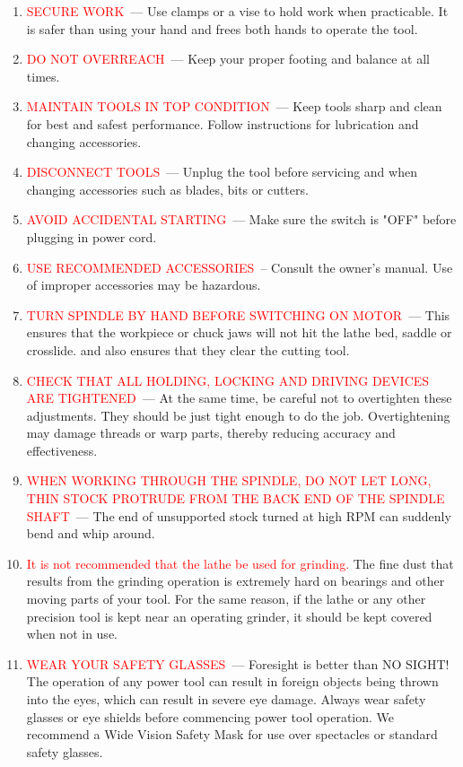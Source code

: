 \begin{enumerate}
\item\textcolor{Red}{SECURE WORK}\ --- Use clamps or a vise to hold work when
practicable. It is safer than using your hand and frees both hands to operate
the tool.

\item\textcolor{Red}{DO NOT OVERREACH}\ --- Keep your proper footing and balance
at all times.

\item\textcolor{Red}{MAINTAIN TOOLS IN TOP CONDITION}\ --- Keep tools sharp and
clean for best and safest performance. Follow instructions for lubrication and
changing accessories.

\item\textcolor{Red}{DISCONNECT TOOLS}\ --- Unplug the tool before servicing and
when changing accessories such as blades, bits or cutters.

\item\textcolor{Red}{AVOID ACCIDENTAL STARTING}\ --- Make sure the switch is
"OFF" before plugging in power cord.

\item\textcolor{Red}{USE RECOMMENDED ACCESSORIES}\ -- Consult the owner's
manual. Use of improper accessories may be hazardous.

\item\textcolor{Red}{TURN SPINDLE BY HAND BEFORE SWITCHING ON MOTOR}\ --- This
ensures that the workpiece or chuck jaws will not hit the lathe bed, saddle or
crosslide. and also ensures that they clear the cutting tool.

\item\textcolor{Red}{CHECK THAT ALL HOLDING, LOCKING AND DRIVING DEVICES ARE
TIGHTENED}\ --- At the same time, be careful not to overtighten these
adjustments. They should be just tight enough to do the job. Overtightening may
damage threads or warp parts, thereby reducing accuracy and effectiveness.

\item\textcolor{Red}{WHEN WORKING THROUGH THE SPINDLE, DO NOT LET LONG, THIN
STOCK PROTRUDE FROM THE BACK END OF THE SPINDLE SHAFT}\ --- The end of
unsupported stock turned at high RPM can suddenly bend and whip around.

\item\textcolor{Red}{It is not recommended that the lathe be used for
grinding.} The fine dust that results from the grinding operation is extremely
hard on bearings and other moving parts of your tool. For the same reason, if
the lathe or any other precision tool is kept near an operating grinder, it
should be kept covered when not in use.

\item\textcolor{Red}{WEAR YOUR SAFETY GLASSES}\ --- Foresight is better than NO
SIGHT! The operation of any power tool can result in foreign objects being
thrown into the eyes, which can result in severe eye damage. Always wear safety
glasses or eye shields before commencing power tool operation. We recommend a
Wide Vision Safety Mask for use over spectacles or standard safety glasses.

\end{enumerate}

